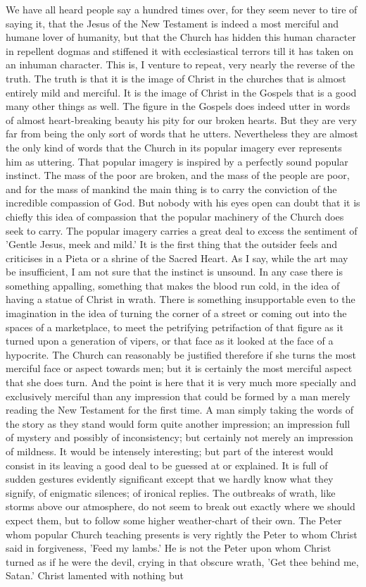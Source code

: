 We have all heard people say a hundred times over, for they seem never to tire of saying it, that the Jesus of the New Testament is indeed a most merciful and humane lover of humanity, but that the Church has hidden this human character in repellent dogmas and stiffened it with ecclesiastical terrors till it has taken on an inhuman character. This is, I venture to repeat, very nearly the reverse of the truth. The truth is that it is the image of Christ in the churches that is almost entirely mild and merciful. It is the image of Christ in the Gospels that is a good many other things as well. The figure in the Gospels does indeed utter in words of almost heart-breaking beauty his pity for our broken hearts. But they are very far from being the only sort of words that he utters. Nevertheless they are almost the only kind of words that the Church in its popular imagery ever represents him as uttering. That popular imagery is inspired by a perfectly sound popular instinct. The mass of the poor are broken, and the mass of the people are poor, and for the mass of mankind the main thing is to carry the conviction of the incredible compassion of God. But nobody with his eyes open can doubt that it is chiefly this idea of compassion that the popular machinery of the Church does seek to carry. The popular imagery carries a great deal to excess the sentiment of 'Gentle Jesus, meek and mild.' It is the first thing that the outsider feels and criticises in a Pieta or a shrine of the Sacred Heart. As I say, while the art may be insufficient, I am not sure that the instinct is unsound. In any case there is something appalling, something that makes the blood run cold, in the idea of having a statue of Christ in wrath. There is something insupportable even to the imagination in the idea of turning the corner of a street or coming out into the spaces of a marketplace, to meet the petrifying petrifaction of that figure as it turned upon a generation of vipers, or that face as it looked at the face of a hypocrite. The Church can reasonably be justified therefore if she turns the most merciful face or aspect towards men; but it is certainly the most merciful aspect that she does turn. And the point is here that it is very much more specially and exclusively merciful than any impression that could be formed by a man merely reading the New Testament for the first time. A man simply taking the words of the story as they stand would form quite another impression; an impression full of mystery and possibly of inconsistency; but certainly not merely an impression of mildness. It would be intensely interesting; but part of the interest would consist in its leaving a good deal to be guessed at or explained. It is full of sudden gestures evidently significant except that we hardly know what they signify, of enigmatic silences; of ironical replies. The outbreaks of wrath, like storms above our atmosphere, do not seem to break out exactly where we should expect them, but to follow some higher weather-chart of their own. The Peter whom popular Church teaching presents is very rightly the Peter to whom Christ said in forgiveness, 'Feed my lambs.' He is not the Peter upon whom Christ turned as if he were the devil, crying in that obscure wrath, 'Get thee behind me, Satan.' Christ lamented with nothing but 